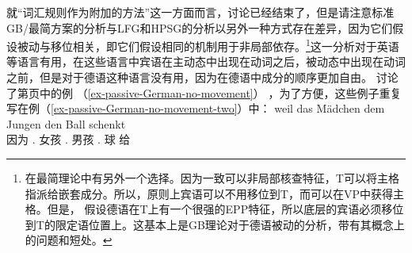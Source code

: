 就“词汇规则作为附加的方法”这一方面而言，讨论已经结束了，但是请注意标准GB/最简方案的分析与LFG和HPSG的分析以另外一种方式存在差异，因为它们假设被动与移位相关，即它们假设相同的机制用于非局部依存。\footnote{%
在最简理论中有另外一个选择。因为一致可以非局部核查特征，T可以将主格指派给嵌套成分。所以，原则上宾语可以不用移位到T，而可以在VP中获得主格。但是， \citet[]{Adger2003a}假设德语在T上有一个很强的EPP特征，所以底层的宾语必须移位到T的限定语位置上。这基本上是GB理论对于德语被动的分析，带有其概念上的问题和短处。  
}这一分析对于英语等语言有用，在这些语言中宾语在主动态中出现在动词之后，被动态中出现在动词之前，但是对于德语这种语言没有用，因为在德语中成分的顺序更加自由。 \citet[\S~4.4.3]{Lenerz77}讨论了第\pageref{ex-passive-German-no-movement}页中的例 （\ref{ex-passive-German-no-movement}） ，为了方便，这些例子重复写在例（\ref{ex-passive-German-no-movement-two}）中：
\addlines
\eal
\label{ex-passive-German-no-movement-two}
\ex 
\gll weil das Mädchen dem Jungen den Ball schenkt\\
     因为 .\nom{} 女孩 .\dat{} 男孩 .\acc{} 球 给\\
